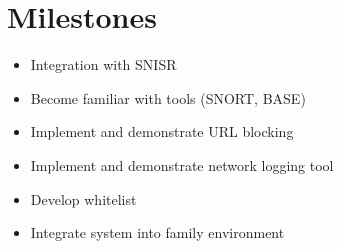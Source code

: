 \documentclass[12pt] {article}
\begin{document}
\section*{Milestones}
\begin{itemize}
    \item Integration with SNISR
    \item Become familiar with tools (SNORT, BASE)
    \item Implement and demonstrate URL blocking
    \item Implement and demonstrate network logging tool
    \item Develop whitelist
    \item Integrate system into family environment
\end{itemize}


{
  
  
}
\end{document}
